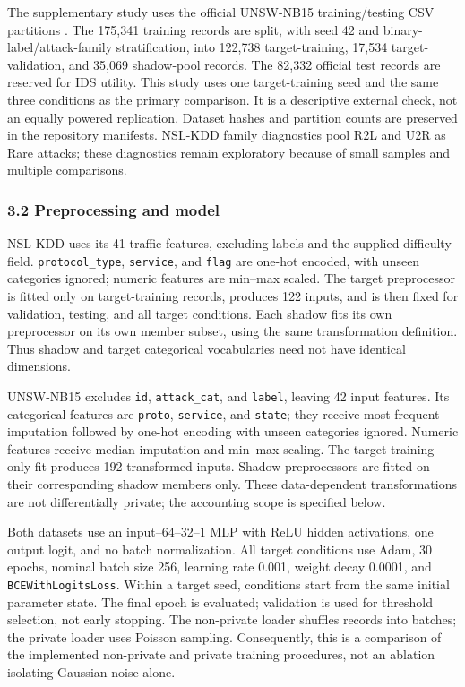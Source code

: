 \documentclass[11pt,a4paper]{article}
\begin{document}
The supplementary study uses the official UNSW-NB15 training/testing CSV
partitions \citep{moustafa2015unsw}. The 175,341 training records are
split, with seed 42 and binary-label/attack-family stratification, into
122,738 target-training, 17,534 target-validation, and 35,069
shadow-pool records. The 82,332 official test records are reserved for
IDS utility. This study uses one target-training seed and the same three
conditions as the primary comparison. It is a descriptive external
check, not an equally powered replication. Dataset hashes and partition
counts are preserved in the repository manifests. NSL-KDD family
diagnostics pool R2L and U2R as Rare attacks; these diagnostics remain
exploratory because of small samples and multiple comparisons.

\hypertarget{preprocessing-and-model}{%
\subsubsection{3.2 Preprocessing and
model}\label{preprocessing-and-model}}

NSL-KDD uses its 41 traffic features, excluding labels and the supplied
difficulty field. \texttt{protocol\_type}, \texttt{service}, and
\texttt{flag} are one-hot encoded, with unseen categories ignored;
numeric features are min--max scaled. The target preprocessor is fitted
only on target-training records, produces 122 inputs, and is then fixed
for validation, testing, and all target conditions. Each shadow fits its
own preprocessor on its own member subset, using the same transformation
definition. Thus shadow and target categorical vocabularies need not
have identical dimensions.

UNSW-NB15 excludes \texttt{id}, \texttt{attack\_cat}, and
\texttt{label}, leaving 42 input features. Its categorical features are
\texttt{proto}, \texttt{service}, and \texttt{state}; they receive
most-frequent imputation followed by one-hot encoding with unseen
categories ignored. Numeric features receive median imputation and
min--max scaling. The target-training-only fit produces 192 transformed
inputs. Shadow preprocessors are fitted on their corresponding shadow
members only. These data-dependent transformations are not
differentially private; the accounting scope is specified below.

Both datasets use an input--64--32--1 MLP with ReLU hidden activations,
one output logit, and no batch normalization. All target conditions use
Adam, 30 epochs, nominal batch size 256, learning rate 0.001, weight
decay 0.0001, and \texttt{BCEWithLogitsLoss}. Within a target seed,
conditions start from the same initial parameter state. The final epoch
is evaluated; validation is used for threshold selection, not early
stopping. The non-private loader shuffles records into batches; the
private loader uses Poisson sampling. Consequently, this is a comparison
of the implemented non-private and private training procedures, not an
ablation isolating Gaussian noise alone.
\end{document}
